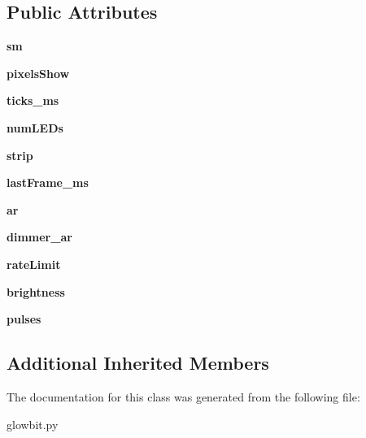\subsection*{Public Attributes}
\begin{DoxyCompactItemize}
\item 
\mbox{\label{classglowbit_1_1stick_a4530fd2c3995bb62da692005599035ad}} 
{\bfseries sm}
\item 
\mbox{\label{classglowbit_1_1stick_adbc03d4d11fcf4ec9cd8c03be41eb930}} 
{\bfseries pixels\+Show}
\item 
\mbox{\label{classglowbit_1_1stick_ae4a58846999c9f0aa96217e845594c03}} 
{\bfseries ticks\+\_\+ms}
\item 
\mbox{\label{classglowbit_1_1stick_a77c1f5290c6d77d290e69bd9d30cadb4}} 
{\bfseries num\+L\+E\+Ds}
\item 
\mbox{\label{classglowbit_1_1stick_a1c76eaa77ff6a78ae391443553ca67cc}} 
{\bfseries strip}
\item 
\mbox{\label{classglowbit_1_1stick_a64532e9357fcfb4430767856da0a3442}} 
{\bfseries last\+Frame\+\_\+ms}
\item 
\mbox{\label{classglowbit_1_1stick_a7c9f9a5cc34ac7ffb8ad260984986184}} 
{\bfseries ar}
\item 
\mbox{\label{classglowbit_1_1stick_abdc6873e1788abb8def8c918463ba6ec}} 
{\bfseries dimmer\+\_\+ar}
\item 
\mbox{\label{classglowbit_1_1stick_a9412ada64a4c63191ca4c8b51c54c521}} 
{\bfseries rate\+Limit}
\item 
\mbox{\label{classglowbit_1_1stick_af8d8ebbc0e29ecaacce4e1b04abf60dc}} 
{\bfseries brightness}
\item 
\mbox{\label{classglowbit_1_1stick_a4c7704f407b6ee9f28136cb39f235cf6}} 
{\bfseries pulses}
\end{DoxyCompactItemize}
\subsection*{Additional Inherited Members}


The documentation for this class was generated from the following file\+:\begin{DoxyCompactItemize}
\item 
glowbit.\+py\end{DoxyCompactItemize}
